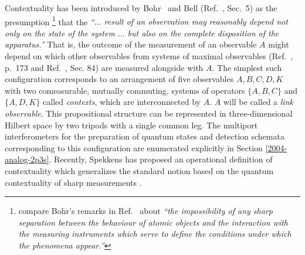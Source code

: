 \documentclass[12pt]{iopart}
\begin{document}
Contextuality \cite{bell-66,hey-red,redhead} has been
introduced by Bohr~\cite{bohr-1949} and Bell (Ref.~\cite{bell-66}, Sec.~5)
as the
presumption
\footnote{
compare Bohr's
remarks in Ref.~\cite{bohr-1949}
about {\em ``the impossibility of any sharp separation
between the behaviour of atomic objects and the interaction with the measuring instruments which serve to define
the conditions under which the phenomena appear.''}
}
that the {\em ``$\ldots$
result of an observation may reasonably depend
not only on the state of the system  $\ldots$
but also on the complete disposition  of the apparatus.''}
That is, the outcome of the measurement of an observable  $A$
might depend on which other observables
from systems of maximal observables
(Ref.~\cite{v-neumann-49}, p.~173 and Ref.~\cite{halmos-vs}, Sec. 84)
are measured alongside with $A$.
The simplest such configuration corresponds to an arrangement
of five observables $A,B,C,D,K$ with two comeasurable, mutually commuting, systems
of operators
$\{A,B,C\}$
and
$\{A,D,K\}$
called {\em contexts},
which are interconnected by $A$.
$A$ will be called a {\em link observable}.
This propositional structure can be represented in three-dimensional Hilbert space
by two tripods with a single common leg.
The multiport interferometers
for the preparation of quantum states
and detection schemata corresponding to this configuration are enumerated explicitly
in Section \ref{2004-analog-2p3s}.
Recently, Spekkens has proposed an operational definition of contextuality
which generalizes the standard notion based on the quantum contextuality of sharp measurements \cite{Spekkens-04}.
\end{document}

